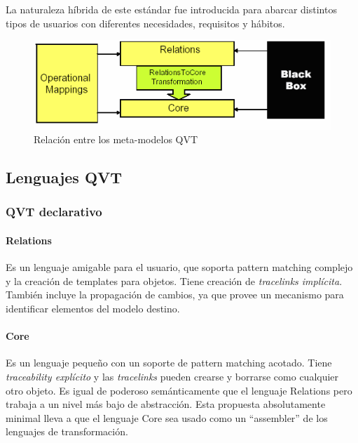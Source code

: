 \documentclass[a4paper,12pt,oneside,spanish]{book}
\begin{document}
La naturaleza híbrida de este estándar fue introducida para abarcar distintos tipos de usuarios con diferentes necesidades, requisitos y hábitos.

\bigskip

\begin{figure}[hbtp]
\centering
\includegraphics[scale=.65]{./img/metamodelosQVT}
\caption{Relación entre los meta-modelos QVT}
\label{fig:QVTmetamodelos}
\end{figure}


\subsection{Lenguajes QVT}


\subsubsection{QVT declarativo}


\paragraph{Relations}

Es un lenguaje amigable para el usuario, que soporta \textsf{pattern matching} complejo y la creación de templates para objetos. Tiene creación de \textit{tracelinks implícita}. También incluye la propagación de cambios, ya que provee un mecanismo para identificar elementos del modelo destino. 

\paragraph{Core}

Es un lenguaje pequeño con un soporte de \textsf{pattern matching} acotado. Tiene \textit{traceability explícito} y las \textit{tracelinks} pueden crearse y borrarse como cualquier otro objeto. Es igual de poderoso semánticamente que el lenguaje \textsf{Relations} pero trabaja a un nivel más bajo de abstracción. Esta propuesta absolutamente minimal lleva a que el lenguaje \textsf{Core} sea usado como un \textsf{“assembler”} de los lenguajes de transformación.
\end{document}
